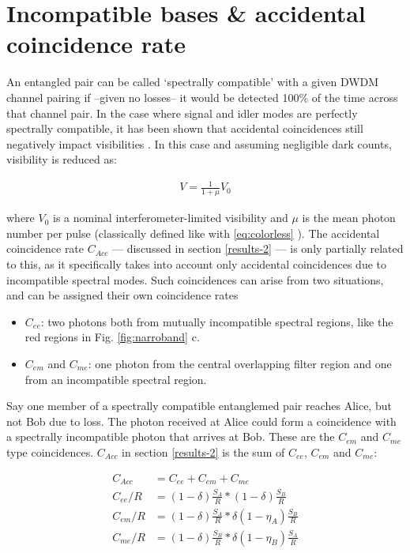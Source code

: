\documentclass[11pt]{caltech_thesis} %
\begin{document}
\hypertarget{incompatible-bases-accidental-coincidence-rate}{%
\section{Incompatible bases \& accidental coincidence rate}\label{incompatible-bases-accidental-coincidence-rate}}

An entangled pair can be called `spectrally compatible' with a given DWDM channel pairing if --given no losses-- it would be detected 100\% of the time across that channel pair. In the case where signal and idler modes are perfectly spectrally compatible, it has been shown that accidental coincidences still negatively impact visibilities \autocite{Kim2022}. In this case and assuming negligible dark counts, visibility is reduced as:

$$
\begin{aligned}
V = \frac{1}{1+\mu}V_0
\end{aligned}
$$

where $V_0$ is a nominal interferometer-limited visibility \autocite{Kim2022} and $\mu$ is the mean photon number per pulse (classically defined like with \ref{eq:colorless} ). The accidental coincidence rate $C_{Acc}$ --- discussed in section \ref{results-2} --- is only partially related to this, as it specifically takes into account only accidental coincidences due to incompatible spectral modes. Such coincidences can arise from two situations, and can be assigned their own coincidence rates

\begin{itemize}
\tightlist
\item
  $C_{ee}$: two photons both from mutually incompatible spectral regions, like the red regions in Fig. \ref{fig:narroband} c.
\item
  $C_{em}$ and $C_{me}$: one photon from the central overlapping filter region and one from an incompatible spectral region.
\end{itemize}

Say one member of a spectrally compatible entanglemed pair reaches Alice, but not Bob due to loss. The photon received at Alice could form a coincidence with a spectrally incompatible photon that arrives at Bob. These are the $C_{em}$ and $C_{me}$ type coincidences. $C_{Acc}$ in section \ref{results-2} is the sum of $C_{ee}$, $C_{em}$ and $C_{me}$:

\begin{align}
    C_{Acc} &= C_{ee} + C_{em} + C_{me} \\
    C_{ee}/R &= (1 - \delta)\frac{S_A}{R} * (1 - \delta)\frac{S_B}{R} \\
    C_{em}/R &= (1 - \delta)\frac{S_A}{R} * \delta (1-\eta_A) \frac{S_B}{R} \\
    C_{me}/R &= (1 - \delta)\frac{S_B}{R} * \delta (1-\eta_B) \frac{S_A}{R} \\
\end{align}
\end{document}
